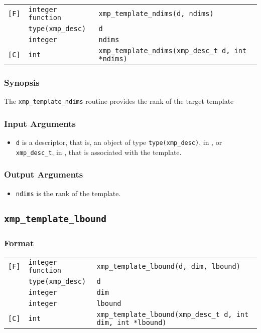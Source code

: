 \begin{tabular}{lll}

\verb![F]!& {\tt integer function}& {\tt xmp\_template\_ndims(d, ndims)}\\
          & {\tt type(xmp\_desc)} & {\tt d}\\
          & {\tt integer} & {\tt ndims}\\

\verb![C]!&  {\tt int}& {\tt xmp\_template\_ndims(xmp\_desc\_t d, int *ndims)}\\

\end{tabular}

\subsubsection*{Synopsis}

The {\tt xmp\_template\_ndims} routine provides the rank of the target template


\subsubsection*{Input Arguments}
\begin{itemize}
 \item {\tt d} is a descriptor, that is, an object of type 
       {\tt type(xmp\_desc)}, in {\XMPF}, or {\tt xmp\_desc\_t},
       in {\XMPC}, that is associated with the template.
\end{itemize}

\subsubsection*{Output Arguments}
\begin{itemize}
 \item {\tt ndims} is the rank of the template.
\end{itemize}


\subsection{\tt xmp\_template\_lbound}

\subsubsection*{Format}

\begin{tabular}{lll}

\verb![F]!& {\tt integer function}& {\tt xmp\_template\_lbound(d, dim, lbound)}\\
          & {\tt type(xmp\_desc)} & {\tt d}\\
          & {\tt integer} & {\tt dim}\\
          & {\tt integer} & {\tt lbound}\\

\verb![C]!&  {\tt int}& {\tt xmp\_template\_lbound(xmp\_desc\_t d, int dim, int *lbound)}\\

\end{tabular}

